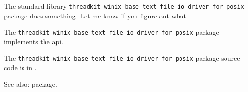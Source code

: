 
The standard library {\tt threadkit\_winix\_base\_text\_file\_io\_driver\_for\_posix} package does something.  Let me know if you figure out what.

The {\tt threadkit\_winix\_base\_text\_file\_io\_driver\_for\_posix} package implements the  api.

The {\tt threadkit\_winix\_base\_text\_file\_io\_driver\_for\_posix} package source code is in 
.

See also:   package.

